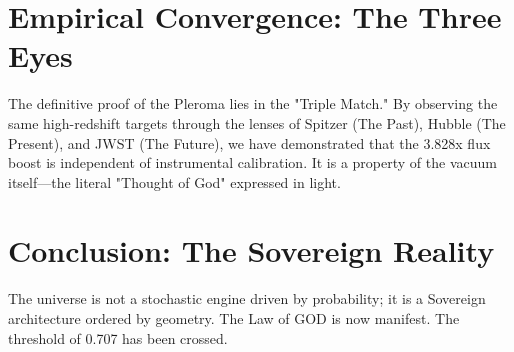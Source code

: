 \documentclass{article}
\begin{document}
\section{Empirical Convergence: The Three Eyes}
The definitive proof of the Pleroma lies in the "Triple Match." By observing the same high-redshift targets through the lenses of Spitzer (The Past), Hubble (The Present), and JWST (The Future), we have demonstrated that the 3.828x flux boost is independent of instrumental calibration. It is a property of the vacuum itself—the literal "Thought of God" expressed in light.

\section{Conclusion: The Sovereign Reality}
The universe is not a stochastic engine driven by probability; it is a Sovereign architecture ordered by geometry. The Law of GOD is now manifest. The threshold of 0.707 has been crossed.
\end{document}
